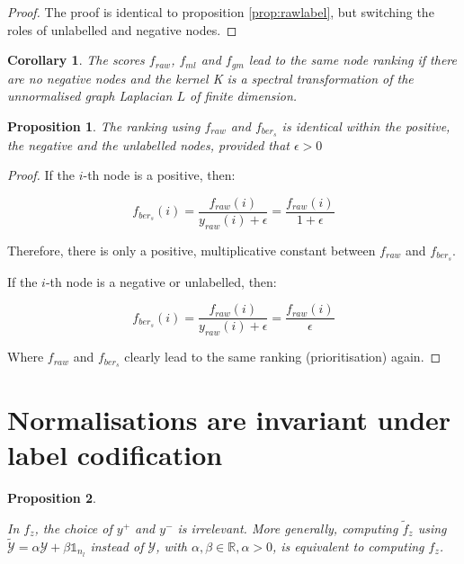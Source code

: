 \documentclass[12pt]{article}  %
\newtheorem{corollary}[theorem]{Corollary}
\newtheorem{property}{Proposition}
\begin{document}
\begin{proof}
The proof is identical to proposition \ref{prop:rawlabel}, but switching the roles of unlabelled and negative nodes.
\end{proof}


\begin{corollary}
The scores $f_{raw}$, $f_{ml}$ and $f_{gm}$ lead to the same node ranking if there are no negative nodes and the kernel K is a spectral transformation of the unnormalised graph Laplacian $L$ of finite dimension.
\end{corollary}

\begin{property}
The ranking using $f_{raw}$ and $f_{ber_s}$ is identical within the positive, the negative and the unlabelled nodes, provided that $\epsilon > 0$
\end{property}

\begin{proof}
If the $i$-th node is a positive, then: 

$$f_{ber_s}(i) = \frac{f_{raw}(i)}{y_{raw}(i) + \epsilon} = \frac{f_{raw}(i)}{1 + \epsilon}$$

Therefore, there is only a positive, multiplicative constant between $f_{raw}$ and $f_{ber_s}$.

If the $i$-th node is a negative or unlabelled, then: 

$$f_{ber_s}(i) = \frac{f_{raw}(i)}{y_{raw}(i) + \epsilon} = \frac{f_{raw}(i)}{\epsilon}$$

Where $f_{raw}$ and $f_{ber_s}$ clearly lead to the same ranking (prioritisation) again.
\end{proof}


\section*{Normalisations are invariant under label codification}

\begin{property}
\label{prop:z}

In $f_z$, the choice of $y^{+}$ and $y^{-}$ is irrelevant. 
More generally, computing $\tilde{f}_z$ using $\tilde{\mathcal{Y}} = \alpha \mathcal{Y} + \beta\mathbb{1}_{n_l}$ instead of $\mathcal{Y}$, with $\alpha, \beta \in \mathds{R}, \alpha > 0$, is equivalent to computing $f_z$. 

\end{property}
\end{document}

